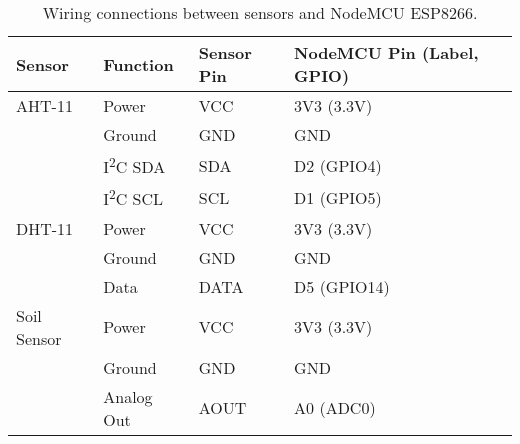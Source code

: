 \documentclass[12pt,a4paper]{article}
\begin{document}
\begin{table}[h]
\centering
\begin{tabular}{|l|l|l|l|}
\hline
\textbf{Sensor} & \textbf{Function} & \textbf{Sensor Pin} & \textbf{NodeMCU Pin (Label, GPIO)} \\
\hline
AHT-11        & Power       & VCC        & 3V3 (3.3V) \\
              & Ground      & GND        & GND \\
              & I\textsuperscript{2}C SDA & SDA        & D2 (GPIO4) \\
              & I\textsuperscript{2}C SCL & SCL        & D1 (GPIO5) \\
\hline
DHT-11        & Power       & VCC        & 3V3 (3.3V) \\
              & Ground      & GND        & GND \\
              & Data        & DATA       & D5 (GPIO14) \\
\hline
Soil Sensor   & Power       & VCC        & 3V3 (3.3V) \\
              & Ground      & GND        & GND \\
              & Analog Out  & AOUT       & A0 (ADC0) \\
\hline
\end{tabular}
\caption{Wiring connections between sensors and NodeMCU ESP8266.}
\label{tab:sensor-connections}
\end{table}

\vspace{0.5cm}

\end{document}
